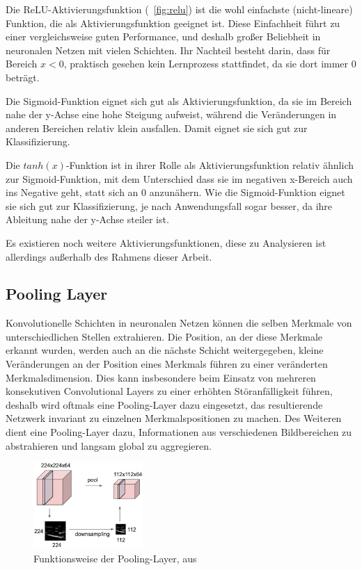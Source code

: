 Die ReLU-Aktivierungsfunktion (\vgl \figurename~\ref{fig:relu}) ist die wohl einfachste (nicht-lineare) Funktion, die als Aktivierungsfunktion geeignet ist. Diese Einfachheit führt zu einer vergleichsweise guten Performance, und deshalb großer Beliebheit in neuronalen Netzen mit vielen Schichten. Ihr Nachteil besteht darin, dass für Bereich $x<0$, praktisch gesehen kein Lernprozess stattfindet, da sie dort immer $0$ beträgt. \cite{kizrak_19}

Die Sigmoid-Funktion eignet sich gut als Aktivierungsfunktion, da sie im Bereich nahe der y-Achse eine hohe Steigung aufweist, während die Veränderungen in anderen Bereichen relativ klein ausfallen. Damit eignet sie sich gut zur Klassifizierung. \cite{kizrak_19}

Die $tanh(x)$-Funktion ist in ihrer Rolle als Aktivierungsfunktion relativ ähnlich zur Sigmoid-Funktion, mit dem Unterschied dass sie im negativen x-Bereich auch ins Negative geht, statt sich an $0$ anzunähern. Wie die Sigmoid-Funktion eignet sie sich gut zur Klassifizierung, je nach Anwendungsfall sogar besser, da ihre Ableitung nahe der y-Achse steiler ist. \cite{kizrak_19}

Es existieren noch weitere Aktivierungsfunktionen, diese zu Analysieren ist allerdings außerhalb des Rahmens dieser Arbeit.

\subsection{Pooling Layer}
\label{ssec:pooling}

Konvolutionelle Schichten in neuronalen Netzen können die selben Merkmale von unterschiedlichen Stellen extrahieren. Die Position, an der diese Merkmale erkannt wurden, werden auch an die nächste Schicht weitergegeben, \dahe kleine Veränderungen an der Position eines Merkmals führen zu einer veränderten Merkmalsdimension. \cite{brownlee_19} Dies kann insbesondere beim Einsatz von mehreren konsekutiven Convolutional Layers zu einer erhöhten Störanfälligkeit führen, deshalb wird oftmals eine Pooling-Layer dazu eingesetzt, das resultierende Netzwerk invariant zu einzelnen Merkmalspositionen zu machen. Des Weiteren dient eine Pooling-Layer dazu, Informationen aus verschiedenen Bildbereichen zu abstrahieren und langsam global zu aggregieren. \cite{deeplearning_16}

\begin{figure}[h!]
	\centering
	\includegraphics[width=0.37\textwidth,keepaspectratio]{images/cs231n/pool.jpg}
	\caption{Funktionsweise der Pooling-Layer, aus \cite{cs231n}}
	\label{fig:pooling}
\end{figure}

